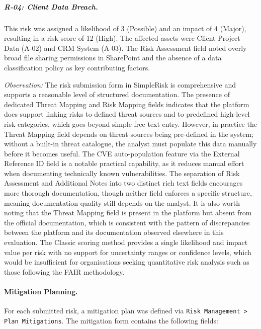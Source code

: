 \subparagraph{R-04: Client Data Breach.}
This risk was assigned a likelihood of 3 (Possible) and an impact of 4 (Major),
resulting in a risk score of 12 (High). The affected assets were Client Project Data
(A-02) and CRM System (A-03). The Risk Assessment field noted overly broad file sharing
permissions in SharePoint and the absence of a data classification policy as key
contributing factors.
 
 
\textit{Observation:} The risk submission form in SimpleRisk is comprehensive and
supports a reasonable level of structured documentation. The presence of dedicated
Threat Mapping and Risk Mapping fields indicates that the platform does support linking
risks to defined threat sources and to predefined high-level risk categories, which goes
beyond simple free-text entry. However, in practice the Threat Mapping field depends on
threat sources being pre-defined in the system; without a built-in threat catalogue, the
analyst must populate this data manually before it becomes useful. The CVE auto-population
feature via the External Reference ID field is a notable practical capability, as it
reduces manual effort when documenting technically known vulnerabilities. The separation
of Risk Assessment and Additional Notes into two distinct rich text fields encourages
more thorough documentation, though neither field enforces a specific structure, meaning
documentation quality still depends on the analyst. It is also worth noting that the
Threat Mapping field is present in the platform but absent from the official
documentation, which is consistent with the pattern of discrepancies between the
platform and its documentation observed elsewhere in this evaluation. The Classic scoring
method provides a single likelihood and impact value per risk with no support for
uncertainty ranges or confidence levels, which would be insufficient for organisations
seeking quantitative risk analysis such as those following the FAIR methodology.

 
\paragraph{Mitigation Planning.}
For each submitted risk, a mitigation plan was defined via
\texttt{Risk Management > Plan Mitigations}. The mitigation form contains the following
fields:
 
